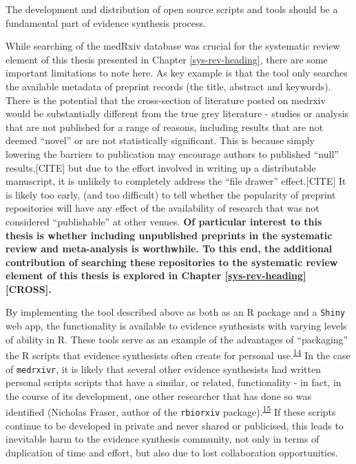 \documentclass[a4paper, twoside]{templates/ociamthesis}
\begin{document}
The development and distribution of open source scripts and tools should be a fundamental part of evidence synthesis process.

While searching of the medRxiv database was crucial for the systematic review element of this thesis presented in Chapter \ref{sys-rev-heading}, there are some important limitations to note here. As key example is that the tool only searches the available metadata of preprint records (the title, abstract and keywords).
There is the potential that the cross-section of literature posted on medrxiv would be substantially different from the true grey literature - studies or analysis that are not published for a range of reasons, including results that are not deemed ``novel'' or are not statistically significant.
This is because simply lowering the barriers to publication may encourage authors to published ``null'' results,{[}CITE{]} but due to the effort involved in writing up a distributable manuscript, it is unlikely to completely address the ``file drawer'' effect.{[}CITE{]}
It is likely too early, (and too difficult) to tell whether the popularity of preprint repositories will have any effect of the availability of research that was not considered ``publishable'' at other venues.
\textbf{Of particular interest to this thesis is whether including unpublished preprints in the systematic review and meta-analysis is worthwhile. To this end, the additional contribution of searching these repositories to the systematic review element of this thesis is explored in Chapter \ref{sys-rev-heading} {[}CROSS{]}.}

By implementing the tool described above as both as an R package and a \texttt{Shiny} web app, the functionality is available to evidence synthesists with varying levels of ability in R.
These tools serve as an example of the advantages of ``packaging'' the R scripts that evidence synthesists often create for personal use.\textsuperscript{\protect\hyperlink{ref-wickham2015r}{14}}
In the case of \texttt{medrxivr}, it is likely that several other evidence synthesists had written personal scripts scripts that have a similar, or related, functionality - in fact, in the course of its development, one other researcher that has done so was identified (Nicholas Fraser, author of the \texttt{rbiorxiv} package).\textsuperscript{\protect\hyperlink{ref-rbiorxiv}{15}}
If these scripts continue to be developed in private and never shared or publicised, this leads to inevitable harm to the evidence synthesis community, not only in terms of duplication of time and effort, but also due to lost collaboration opportunities.
\end{document}

